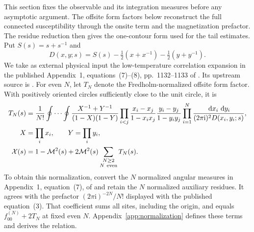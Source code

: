 \documentclass[11pt]{article}
\numberwithin{equation}{section}
\theoremstyle{definition}
\newcommand{\dd}{\,\mathrm d}
\newcommand{\ii}{\mathrm i}
\newcommand{\M}{\mathcal M}
\begin{document}
This section fixes the observable and its integration measures before
any asymptotic argument. The offsite form factors below reconstruct the
full connected susceptibility through the onsite term and the
magnetization prefactor. The residue reduction then gives the
one-contour form used for the tail estimates.
Put \(S(s)=s+s^{-1}\) and
\[
 D(x,y;s)=S(s)-\tfrac12(x+x^{-1})-\tfrac12(y+y^{-1}).
\]
We take as external physical input the low-temperature correlation
expansion in the published Appendix~1, equations~(7)--(8),
pp.~1132--1133 of \cite{TW2014}. Its upstream source is
\cite[Cor.~2.0, p.~351; Thm.~4.1, p.~361; Thm.~5.0, p.~374,
and proof pp.~375--378]{PalmerTracy1981}.
For even \(N\), let \(T_N\) denote the Fredholm-normalized offsite
form factor. With positively oriented circles sufficiently close to the
unit circle, it is
\begin{align}
 T_N(s)&=\frac1{N!}\oint\cdots\oint
 \frac{X^{-1}+Y^{-1}}{(1-X)(1-Y)}
 \prod_{i<j}\frac{x_i-x_j}{1-x_ix_j}
              \frac{y_i-y_j}{1-y_iy_j}
 \prod_{i=1}^N\frac{\dd x_i\,\dd y_i}{(2\pi\ii)^2D(x_i,y_i;s)},\label{eq:double}\\
 X&=\prod_i x_i,\qquad Y=\prod_i y_i, \nonumber\\
 \mathcal X(s)&=1-\M^2(s)+2\M^2(s)\sum_{\substack{N\ge2\\N\ {\rm even}}}T_N(s).
 \label{eq:bulk}
\end{align}
To obtain this normalization, convert the \(N\) normalized angular
measures in Appendix~1, equation~(7), of \cite{TW2014} and retain
the \(N\) normalized auxiliary residues. It agrees with the prefactor
\((2\pi\ii)^{-2N}/N!\) displayed with the published equation~(3).
That coefficient sums all sites, including the origin, and equals
\(f_{00}^{(N)}+2T_N\) at fixed even \(N\).
Appendix~\ref{app:normalization} defines these terms and derives the relation.
\end{document}
